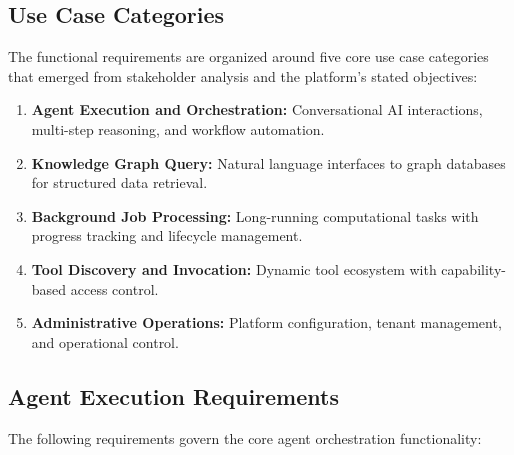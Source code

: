 \subsection{Use Case Categories}
\label{subsec:use-case-categories}

The functional requirements are organized around five core use case categories that emerged from stakeholder analysis and the platform's stated objectives:

\begin{enumerate}
    \item \textbf{Agent Execution and Orchestration:} Conversational AI interactions, multi-step reasoning, and workflow automation.
    \item \textbf{Knowledge Graph Query:} Natural language interfaces to graph databases for structured data retrieval.
    \item \textbf{Background Job Processing:} Long-running computational tasks with progress tracking and lifecycle management.
    \item \textbf{Tool Discovery and Invocation:} Dynamic tool ecosystem with capability-based access control.
    \item \textbf{Administrative Operations:} Platform configuration, tenant management, and operational control.
\end{enumerate}

\subsection{Agent Execution Requirements}
\label{subsec:fr-agent-execution}

The following requirements govern the core agent orchestration functionality:

